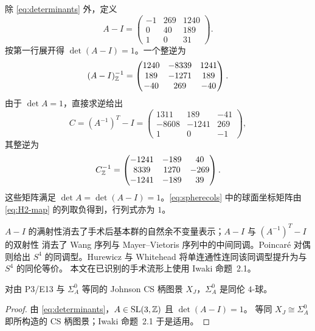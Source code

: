 除 \eqref{eq:determinants} 外，定义
\begin{equation}\label{eq:A-minus-I}
A-I=
\begin{pmatrix}
-1&269&1240\\
0&40&189\\
1&0&31
\end{pmatrix}.
\end{equation}
按第一行展开得 $\det(A-I)=1$。一个整逆为
\begin{equation}\label{eq:B-inverse}
(A-I)^{-1}_{\mathbb{Z}}=
\begin{pmatrix}
1240&-8339&1241\\
189&-1271&189\\
-40&269&-40
\end{pmatrix}.
\end{equation}
由于 $\det A=1$，直接求逆给出
\begin{equation}\label{eq:H2-map}
C=(A^{-1})^T-I=
\begin{pmatrix}
1311&189&-41\\
-8608&-1241&269\\
1&0&-1
\end{pmatrix},
\end{equation}
其整逆为
\begin{equation}\label{eq:H2-inverse}
C^{-1}_{\mathbb{Z}}=
\begin{pmatrix}
-1241&-189&40\\
8339&1270&-269\\
-1241&-189&39
\end{pmatrix}.
\end{equation}
这些矩阵满足 $\det A=\det(A-I)=1$。\eqref{eq:spherecols} 中的球面坐标矩阵由
\eqref{eq:H2-map} 的列取负得到，行列式亦为 $1$。

\begin{remark}[长拓扑路线]\label{rem:long-topology-route}
$A-I$ 的满射性消去了手术后基本群的自然余不变量表示；$A-I$ 与 $(A^{-1})^T-I$ 的双射性
消去了 Wang 序列与 Mayer--Vietoris 序列中的中间同调。Poincar\'e 对偶则给出 $S^4$
的同调型。Hurewicz 与 Whitehead 将单连通性连同该同调型提升为与 $S^4$ 的同伦等价。
本文在已识别的手术流形上使用 Iwaki
命题~2.1。
\end{remark}

\begin{corollary}[对已识别图景的同伦球结论]
\label{cor:homotopy-sphere}
对由 P3/E13 与 $\Sigma_A^0$ 等同的 Johnson CS 柄图景 $X_J$，$\Sigma_A^0$ 是同伦
$4$-球。
\end{corollary}

\begin{proof}
由 \eqref{eq:determinants}，$A\in\mathrm{SL}(3,\mathbb{Z})$ 且 $\det(A-I)=1$。
等同 $X_J\cong\Sigma_A^0$ 即所构造的 CS 柄图景；Iwaki 命题~2.1 \cite{Iwaki2024} 于是适用。
\end{proof}


